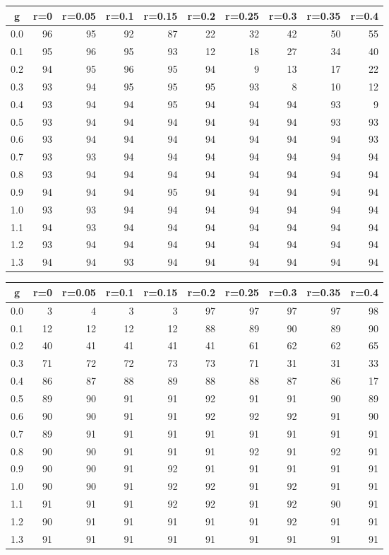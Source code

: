 %
\begin{table}[!tbp]
 \begin{center}
 \begin{tabular}{rrrrrrrrrr}\hline\hline
\multicolumn{1}{c}{g}&\multicolumn{1}{c}{r=0}&\multicolumn{1}{c}{r=0.05}&\multicolumn{1}{c}{r=0.1}&\multicolumn{1}{c}{r=0.15}&\multicolumn{1}{c}{r=0.2}&\multicolumn{1}{c}{r=0.25}&\multicolumn{1}{c}{r=0.3}&\multicolumn{1}{c}{r=0.35}&\multicolumn{1}{c}{r=0.4}\tabularnewline
\hline
0.0&96&95&92&87&22&32&42&50&55\tabularnewline
0.1&95&96&95&93&12&18&27&34&40\tabularnewline
0.2&94&95&96&95&94& 9&13&17&22\tabularnewline
0.3&93&94&95&95&95&93& 8&10&12\tabularnewline
0.4&93&94&94&95&94&94&94&93& 9\tabularnewline
0.5&93&94&94&94&94&94&94&93&93\tabularnewline
0.6&93&94&94&94&94&94&94&94&93\tabularnewline
0.7&93&93&94&94&94&94&94&94&94\tabularnewline
0.8&93&94&94&94&94&94&94&94&94\tabularnewline
0.9&94&94&94&95&94&94&94&94&94\tabularnewline
1.0&93&93&94&94&94&94&94&94&94\tabularnewline
1.1&94&93&94&94&94&94&94&94&94\tabularnewline
1.2&93&94&94&94&94&94&94&94&94\tabularnewline
1.3&94&94&93&94&94&94&94&94&94\tabularnewline
\hline
\end{tabular}

\end{center}

\end{table}

%
\begin{table}[!tbp]
 \begin{center}
 \begin{tabular}{rrrrrrrrrr}\hline\hline
\multicolumn{1}{c}{g}&\multicolumn{1}{c}{r=0}&\multicolumn{1}{c}{r=0.05}&\multicolumn{1}{c}{r=0.1}&\multicolumn{1}{c}{r=0.15}&\multicolumn{1}{c}{r=0.2}&\multicolumn{1}{c}{r=0.25}&\multicolumn{1}{c}{r=0.3}&\multicolumn{1}{c}{r=0.35}&\multicolumn{1}{c}{r=0.4}\tabularnewline
\hline
0.0& 3& 4& 3& 3&97&97&97&97&98\tabularnewline
0.1&12&12&12&12&88&89&90&89&90\tabularnewline
0.2&40&41&41&41&41&61&62&62&65\tabularnewline
0.3&71&72&72&73&73&71&31&31&33\tabularnewline
0.4&86&87&88&89&88&88&87&86&17\tabularnewline
0.5&89&90&91&91&92&91&91&90&89\tabularnewline
0.6&90&90&91&91&92&92&92&91&90\tabularnewline
0.7&89&91&91&91&91&91&91&91&91\tabularnewline
0.8&90&90&91&91&91&92&91&92&91\tabularnewline
0.9&90&90&91&92&91&91&91&91&91\tabularnewline
1.0&90&90&91&92&92&91&92&91&91\tabularnewline
1.1&91&91&91&92&92&91&92&90&91\tabularnewline
1.2&90&91&91&91&91&91&92&91&91\tabularnewline
1.3&91&91&91&91&91&91&91&91&91\tabularnewline
\hline
\end{tabular}

\end{center}

\end{table}

